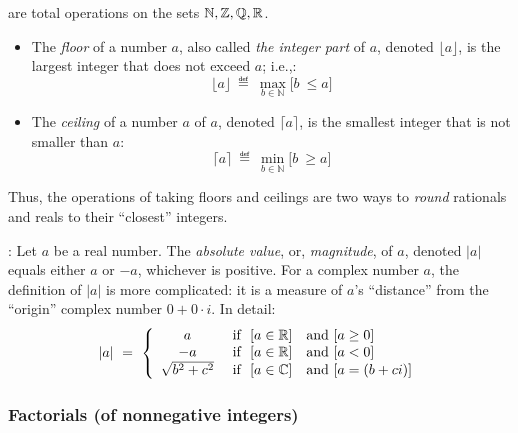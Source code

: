 are total operations on the sets $\mathbb{N}, \mathbb{Z}, \mathbb{Q}, \mathbb{R}$.
\begin{itemize}
\item
The {\it floor} of a number $a$, also called {\it the integer part}
of $a$, denoted $\lfloor a \rfloor$, is the largest integer that does
not exceed $a$; i.e.,:
\[
\lfloor a \rfloor \ \eqdef \ \max_{b \in {\mathbb{N}}} \Big[ b \ \leq a \Big]
\]
\item
The {\it ceiling} of a number $a$
of $a$, denoted $\lceil a \rceil$, is the smallest integer that is 
not smaller than $a$:
\[
\lceil a \rceil \ \eqdef \ \min_{b \in {\mathbb{N}}} \Big[ b \ \geq a \Big]
\]
\end{itemize}
Thus, the operations of taking floors and ceilings are two ways to
{\em round} rationals and reals to their ``closest''
integers.

\medskip

:
%
Let $a$ be a real number.  The {\it absolute value}, or, {\it
  magnitude}, of $a$, denoted $|a|$ equals either $a$ or $-a$,
whichever is positive.  For a complex number $a$, the definition of
$|a|$ is more complicated: it is a measure of $a$'s ``distance'' from
the ``origin'' complex number $0 + 0 \cdot i$.  In detail:
\[
|a| \ = \ \left\{
\begin{array}{cl}
a & \mbox{ if } \ [a \in \mathbb{R}] \ \ \mbox{ and } [a \geq 0] \\
-a & \mbox{ if } \ [a \in \mathbb{R}] \ \ \mbox{ and } [a < 0] \\
\sqrt{b^2 + c^2} &  \mbox{ if } \ [a \in \mathbb{C}]  \ \ \mbox{ and } [a = (b+ci)]
\end{array}
\right.
\]

\subsubsection{Factorials (of nonnegative integers)}


